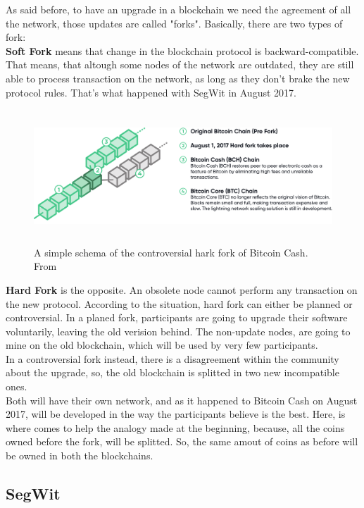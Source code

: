 As said before, to have an upgrade in a blockchain we need the agreement of all
the network, those updates are called "forks". Basically, there are two types 
of fork:
\bigskip\\
\textbf{Soft Fork}
means that change in the blockchain protocol is backward-compatible. That means,
that altough some nodes of the network are outdated, they are still able to 
process transaction on the network, as long as they don't brake the new protocol rules.
That's what happened with SegWit in August 2017.
\bigskip\\
\begin{figure}
    \centering
    \includegraphics[height=5cm]{fork-img.png}
    \caption{A simple schema of the controversial hark fork of Bitcoin Cash. From \cite{bitcoin.com}}
    \label{fig:hardfork}
\end{figure}
\textbf{Hard Fork}
is the opposite. An obsolete node cannot perform any transaction on the new protocol.
According to the situation, hard fork can either be planned or controversial.
In a planed fork, participants are going to upgrade their software voluntarily,
leaving the old verision behind. The non-update nodes, are going to mine on the old 
blockchain, which will be used by very few participants.\\
In a controversial fork instead, there is a disagreement within the community about
the upgrade, so, the old blockchain is splitted in two new incompatible ones.\\ 
Both will have their own network, and as it happened to Bitcoin Cash on August 2017, 
will be developed in the way the participants believe is the best. Here, is where 
comes to help the analogy made at the beginning, because, all the coins owned before 
the fork, will be splitted. So, the same amout of coins as before will be owned in 
both the blockchains.\cite{binancevision}


\subsection{SegWit}
\label{sec:segwit}

